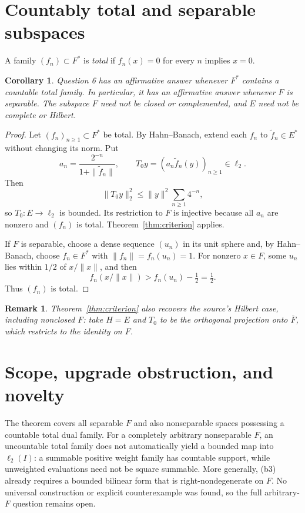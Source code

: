 \documentclass[11pt,a4paper]{article}
\newtheorem{corollary}[theorem]{Corollary}
\newtheorem{remark}[theorem]{Remark}
\begin{document}
\section{Countably total and separable subspaces}

A family $(f_n)\subset F^*$ is \emph{total} if
$f_n(x)=0$ for every $n$ implies $x=0$.

\begin{corollary}\label{cor:total}
Question 6 has an affirmative answer whenever $F^*$ contains a countable
total family.  In particular, it has an affirmative answer whenever $F$ is
separable.  The subspace $F$ need not be closed or complemented, and $E$ need
not be complete or Hilbert.
\end{corollary}

\begin{proof}
Let $(f_n)_{n\ge1}\subset F^*$ be total.  By Hahn--Banach, extend each $f_n$
to $\widetilde f_n\in E^*$ without changing its norm.  Put
\[
 a_n=\frac{2^{-n}}{1+\|\widetilde f_n\|},\qquad
 T_0y=(a_n\widetilde f_n(y))_{n\ge1}\in\ell_2.
\]
Then
\[
 \|T_0y\|_2^2\le \|y\|^2\sum_{n\ge1}4^{-n},
\]
so $T_0:E\to\ell_2$ is bounded.  Its restriction to $F$ is injective because
all $a_n$ are nonzero and $(f_n)$ is total.  Theorem~\ref{thm:criterion}
applies.

If $F$ is separable, choose a dense sequence $(u_n)$ in its unit sphere and,
by Hahn--Banach, choose $f_n\in F^*$ with $\|f_n\|=f_n(u_n)=1$.  For nonzero
$x\in F$, some $u_n$ lies within $1/2$ of $x/\|x\|$, and then
\[
 f_n(x/\|x\|)>f_n(u_n)-\tfrac12=\tfrac12.
\]
Thus $(f_n)$ is total.
\end{proof}

\begin{remark}
Theorem~\ref{thm:criterion} also recovers the source's Hilbert case, including
nonclosed $F$: take $H=E$ and $T_0$ to be the orthogonal projection onto
$\overline F$, which restricts to the identity on $F$.
\end{remark}

\section{Scope, upgrade obstruction, and novelty}

The theorem covers all separable $F$ and also nonseparable spaces possessing
a countable total dual family.  For a completely arbitrary nonseparable
$F$, an uncountable total family does not automatically yield a bounded map
into $\ell_2(I)$: a summable positive weight family has countable support,
while unweighted evaluations need not be square summable.  More generally,
(b3) already requires a bounded bilinear form that is right-nondegenerate on
$F$.  No universal construction or explicit counterexample was found, so the
full arbitrary-$F$ question remains open.
\end{document}

